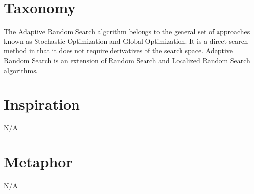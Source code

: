 \documentclass[a4paper, 11pt]{article}
\begin{document}
\section{Taxonomy}
\label{sec:taxonomy}
The Adaptive Random Search algorithm belongs to the general set of approaches known as Stochastic Optimization and Global Optimization. It is a direct search method in that it does not require derivatives of the search space.
Adaptive Random Search is an extension of Random Search and Localized Random Search algorithms.

\section{Inspiration}
\label{sec:inspiration}
N/A

\section{Metaphor}
\label{sec:metaphor}
N/A
\end{document}
